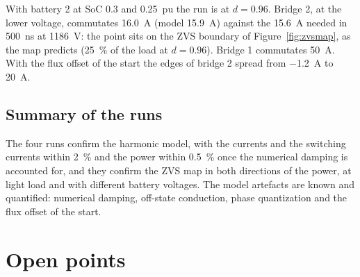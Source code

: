 \documentclass[12pt,a4paper]{scrartcl}
\begin{document}
\begin{onehalfspace}
With battery 2 at SoC 0.3 and \SI{0.25}{pu} the run is at $d = 0.96$. Bridge 2, at the lower voltage, commutates \SI{16.0}{\ampere} (model \SI{15.9}{\ampere}) against the \SI{15.6}{\ampere} needed in \SI{500}{\nano\second} at \SI{1186}{\volt}: the point sits on the ZVS boundary of Figure~\ref{fig:zvsmap}, as the map predicts (\SI{25}{\percent} of the load at $d = 0.96$). Bridge 1 commutates \SI{50}{\ampere}. With the flux offset of the start the edges of bridge 2 spread from \SI{-1.2}{\ampere} to \SI{20}{\ampere}.

\subsection{Summary of the runs}
\label{sec:runs_summary}

The four runs confirm the harmonic model, with the currents and the switching currents within \SI{2}{\percent} and the power within \SI{0.5}{\percent} once the numerical damping is accounted for, and they confirm the ZVS map in both directions of the power, at light load and with different battery voltages. The model artefacts are known and quantified: numerical damping, off-state conduction, phase quantization and the flux offset of the start.

\section{Open points}
\label{sec:open}


\end{onehalfspace}
\end{document}
